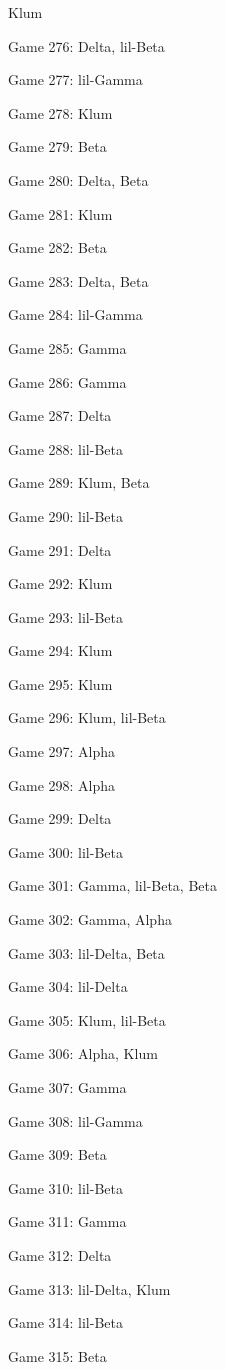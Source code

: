 \documentclass{article}
\begin{document}
\begin{multicols}{3}
\begin{compactitem}
Klum
\item Game 276:
Delta, lil-Beta
\item Game 277:
lil-Gamma
\item Game 278:
Klum
\item Game 279:
Beta
\item Game 280:
Delta, Beta
\item Game 281:
Klum
\item Game 282:
Beta
\item Game 283:
Delta, Beta
\item Game 284:
lil-Gamma
\item Game 285:
Gamma
\item Game 286:
Gamma
\item Game 287:
Delta
\item Game 288:
lil-Beta
\item Game 289:
Klum, Beta
\item Game 290:
lil-Beta
\item Game 291:
Delta
\item Game 292:
Klum
\item Game 293:
lil-Beta
\item Game 294:
Klum
\item Game 295:
Klum
\item Game 296:
Klum, lil-Beta
\item Game 297:
Alpha
\item Game 298:
Alpha
\item Game 299:
Delta
\item Game 300:
lil-Beta
\item Game 301:
Gamma, lil-Beta, Beta
\item Game 302:
Gamma, Alpha
\item Game 303:
lil-Delta, Beta
\item Game 304:
lil-Delta
\item Game 305:
Klum, lil-Beta
\item Game 306:
Alpha, Klum
\item Game 307:
Gamma
\item Game 308:
lil-Gamma
\item Game 309:
Beta
\item Game 310:
lil-Beta
\item Game 311:
Gamma
\item Game 312:
Delta
\item Game 313:
lil-Delta, Klum
\item Game 314:
lil-Beta
\item Game 315:
Beta

\end{compactitem}
\end{multicols}
\end{document}

